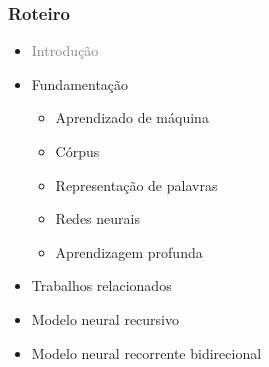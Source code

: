 \documentclass[10pt]{beamer}
\begin{document}
\begin{frame}
  \frametitle{Roteiro}


  \begin{itemize}


    
    \item[\color{gray}{$\bullet$}] \textcolor{gray}{Introdução}
    
    
    \item Fundamentação
    \begin{itemize}
      \item[\ ] Aprendizado de máquina
      \item[\ ] Córpus
      \item[\ ] Representação de palavras
      \item[\ ] Redes neurais
      \item[\ ] Aprendizagem profunda
    \end{itemize}


    \color{gray}
    \item[\color{gray}{$\bullet$}] Trabalhos relacionados

    \item[\color{gray}{$\bullet$}] Modelo neural recursivo

    \item[\color{gray}{$\bullet$}] Modelo neural recorrente bidirecional


\end{itemize}
\end{frame}
\end{document}
